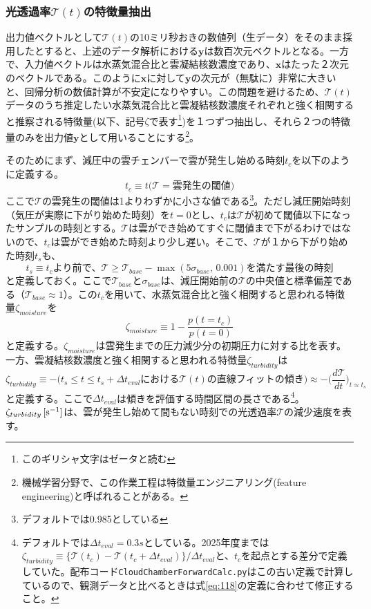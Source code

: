 \documentclass{ltjsarticle}
\begin{document}
\subsubsection{光透過率$\mathcal{T}(t)$の特徴量抽出}
出力値ベクトルとして$\mathcal{T}(t)$の10ミリ秒おきの数値列（生データ）をそのまま採用したとすると、上述のデータ解析における$\bm{y}$は数百次元ベクトルとなる。一方で、入力値ベクトルは水蒸気混合比と雲凝結核数濃度であり、$\bm{x}$はたった２次元のベクトルである。このように$\bm{x}$に対して$\bm{y}$の次元が（無駄に）非常に大きいと、回帰分析の数値計算が不安定になりやすい。この問題を避けるため、$\mathcal{T}(t)$データのうち推定したい水蒸気混合比と雲凝結核数濃度それぞれと強く相関すると推察される特徴量(以下、記号$\zeta$で表す\footnote{このギリシャ文字はゼータと読む})を１つずつ抽出し、それら２つの特徴量のみを出力値$\bm{y}$として用いることにする\footnote{機械学習分野で、この作業工程は特徴量エンジニアリング(feature engineering)と呼ばれることがある。}。

そのためにまず、減圧中の雲チェンバーで雲が発生し始める時刻$t_{c}$を以下のように定義する。
\begin{equation}\label{eq:116}
t_{c} \equiv t {\big(} \mathcal{T} = 雲発生の閾値 {\big )}
\end{equation}
ここで$\mathcal{T}$の雲発生の閾値は1よりわずかに小さな値である\footnote{デフォルトでは0.985としている}。ただし減圧開始時刻（気圧が実際に下がり始めた時刻）を$t=0$とし、$t_{c}$は$\mathcal{T}$が初めて閾値以下になったサンプルの時刻とする。$\mathcal{T}$は雲ができ始めてすぐに閾値まで下がるわけではないので、$t_{c}$は雲ができ始めた時刻より少し遅い。そこで、$\mathcal{T}$が１から下がり始めた時刻$t_{s}$も、
\begin{equation}\label{eq:ts}
t_{s} \equiv t_{c}より前で、\mathcal{T}\ge \mathcal{T}_{base}-\max(5\sigma_{base},\,0.001)を満たす最後の時刻
\end{equation}
と定義しておく。ここで$\mathcal{T}_{base}$と$\sigma_{base}$は、減圧開始前の$\mathcal{T}$の中央値と標準偏差である（$\mathcal{T}_{base}\approx1$）。この$t_{c}$を用いて、水蒸気混合比と強く相関すると思われる特徴量$\zeta_{moisture}$を
\begin{equation}\label{eq:117}
\zeta_{moisture} \equiv 1 - \frac{p(t=t_{c})}{p(t=0)}
\end{equation}
と定義する。$\zeta_{moisture}$は雲発生までの圧力減少分の初期圧力に対する比を表す。一方、雲凝結核数濃度と強く相関すると思われる特徴量$\zeta_{turbidity}$は
\begin{equation}\label{eq:118}
\zeta_{turbidity} \equiv -{\bigg (}t_{s}\le t\le t_{s}+\Delta t_{eval}における\mathcal{T}(t)の直線フィットの傾き{\bigg )} \approx -{\bigg (}\frac{d\mathcal{T}}{dt}{\bigg )}_{t\approx t_{s}}
\end{equation}
と定義する。ここで$\Delta t_{eval}$は傾きを評価する時間区間の長さである\footnote{デフォルトでは$\Delta t_{eval}= 0.3s$としている。2025年度までは$\zeta_{turbidity}\equiv\{\mathcal{T}(t_{c})-\mathcal{T}(t_{c}+\Delta t_{eval})\}/\Delta t_{eval}$と、$t_{c}$を起点とする差分で定義していた。配布コード\texttt{CloudChamberForwardCalc.py}はこの古い定義で計算しているので、観測データと比べるときは式\eqref{eq:118}の定義に合わせて修正すること。}。 $\zeta_{turbidity} \, \rm[s^{-1}]$は、雲が発生し始めて間もない時刻での光透過率$\mathcal{T}$の減少速度を表す。
\end{document}
